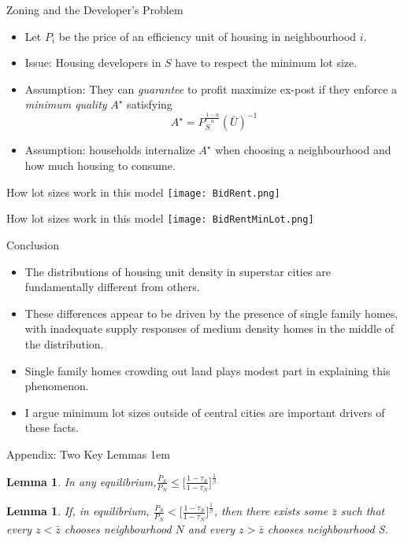 \documentclass{beamer}
\theoremstyle{plain}
\newtheorem{lem}[thm]{Lemma}
\begin{document}
\begin{frame}{Zoning and the Developer's Problem}
	\begin{itemize}
		\color{black}
		\item Let $P_{i}$ be the price of an efficiency unit of housing in neighbourhood $i$. 
		\item Issue: Housing developers in $S$ have to respect the minimum lot size. 
		\item Assumption: They can \textit{guarantee} to profit maximize ex-post if they enforce a \textit{minimum quality} $A^{\star}$ satisfying 
		\begin{equation}
			A^{\star} = P_{S}^{\frac{1-\alpha}{\alpha}}(\bar{U})^{-1}
		\end{equation}
		\item Assumption: households internalize $A^{\star}$ when choosing a neighbourhood and how much housing to consume.
	\end{itemize}
\end{frame}

\begin{frame}{How lot sizes work in this model}
\texttt{[image: BidRent.png]}
\end{frame}

\begin{frame}{How lot sizes work in this model}
\texttt{[image: BidRentMinLot.png]}
\end{frame}

\begin{frame}{Conclusion}
\begin{itemize}
	\itemsep1em
	\item The distributions of housing unit density in superstar cities are fundamentally different from others. 
	\item These differences appear to be driven by the presence of single family homes, with inadequate supply responses of medium density homes in the middle of the distribution.
	\item Single family homes crowding out land plays modest part in explaining this phenomenon. 
	\item I argue minimum lot sizes outside of central cities are important drivers of these facts. 
\end{itemize}
\end{frame}


\appendix
\begin{frame}{Appendix: Two Key Lemmas}
	\itemsep1em
	\begin{lem}
		In any equilibrium,$\frac{P_{S}}{P_{N}} \leq \bigg[\frac{1-\tau_{S}}{1-\tau_{N}}\bigg]^{\frac{1}{\beta}}$ \pause
	\end{lem}
	\begin{lem}
		If, in equilibrium, $\frac{P_{S}}{P_{N}} < \bigg[\frac{1-\tau_{S}}{1-\tau_{N}}\bigg]^{\frac{1}{\beta}}$, then there exists some $\bar{z}$ such that every $z < \bar{z}$ chooses neighbourhood $N$ and every $z > \bar{z}$ chooses neighbourhood S. 
	\end{lem}
\end{frame}
\end{document}
